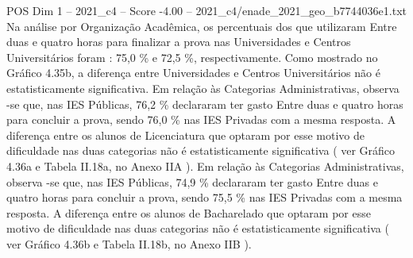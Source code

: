 \begin{textsample}{POS Dim 1 – 2021\_c4 – Score -4.00 – 2021\_c4/enade\_2021\_geo\_b7744036e1.txt}
Na análise por Organização Acadêmica, os percentuais dos que utilizaram Entre duas e quatro horas para finalizar a prova nas Universidades e Centros Universitários foram : 75,0 \% e 72,5 \%, respectivamente.
Como mostrado no Gráfico 4.35b, a diferença entre Universidades e Centros Universitários não é estatisticamente significativa.
Em relação às Categorias Administrativas, observa -se que, nas IES Públicas, 76,2 \% declararam ter gasto Entre duas e quatro horas para concluir a prova, sendo 76,0 \% nas IES Privadas com a mesma resposta.
A diferença entre os alunos de Licenciatura que optaram por esse motivo de dificuldade nas duas categorias não é estatisticamente significativa ( ver Gráfico 4.36a e Tabela II.18a, no Anexo IIA ).
Em relação às Categorias Administrativas, observa -se que, nas IES Públicas, 74,9 \% declararam ter gasto Entre duas e quatro horas para concluir a prova, sendo 75,5 \% nas IES Privadas com a mesma resposta.
A diferença entre os alunos de Bacharelado que optaram por esse motivo de dificuldade nas duas categorias não é estatisticamente significativa ( ver Gráfico 4.36b e Tabela II.18b, no Anexo IIB ).

\end{textsample}
